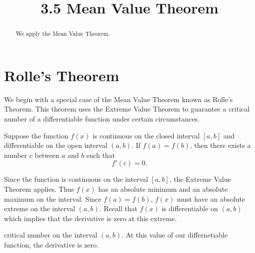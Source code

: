 \documentclass{ximera}
\title{3.5 Mean Value Theorem}
\begin{document}
\begin{abstract}
We apply the Mean Value Theorem.
\end{abstract}

\maketitle

\section{Rolle's Theorem}
We begin with a special case of the Mean Value Theorem known as Rolle's Theorem.
This theorem uses the Extreme Value Theorem to guarantee a critical number of a differentiable function under certain circumstances.

\begin{theorem}
Suppose the function $f(x)$ is continuous on the closed interval $[a,b]$ and differentiable on the open interval $(a,b)$.
If $f(a) = f(b)$, then there exists a number $c$ between $a$ and $b$ such that 
\[
f'(c) = 0.
\]
\end{theorem}

\begin{image}
\end{image}
Since the function is continuous on the interval $[a,b]$, the Extreme Value Theorem applies.
Thus $f(x)$ has an absolute minimum and an absolute maximum on the interval.
Since $f(a) = f(b)$, $f(x)$ must have an absolute extreme on the interval $(a,b)$.
Recall that $f(x)$ is differentiable on $(a,b)$ which implies that the derivative is zero at this extreme.

 critical number on the interval $(a,b)$. 
At this value of our differnetiable function, the derivative is zero.
\end{document}
